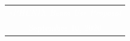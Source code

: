 \afterpage{\restorepagecolor}
\renewcommand*\familydefault{\sfdefault}
{\sffamily

\vspace*{\fill}
\noindent
{}
\vspace*{\fill}

\begin{center}
  \begin{tabular}{c}
    \emph{\Large{\textcolor{white}{sPHENIX Beam Use Proposal}}} \\
    \large{\textcolor{white}{September 10, 2020}}
  \end{tabular}
\end{center}
}

\renewcommand*\familydefault{\rmdefault}
